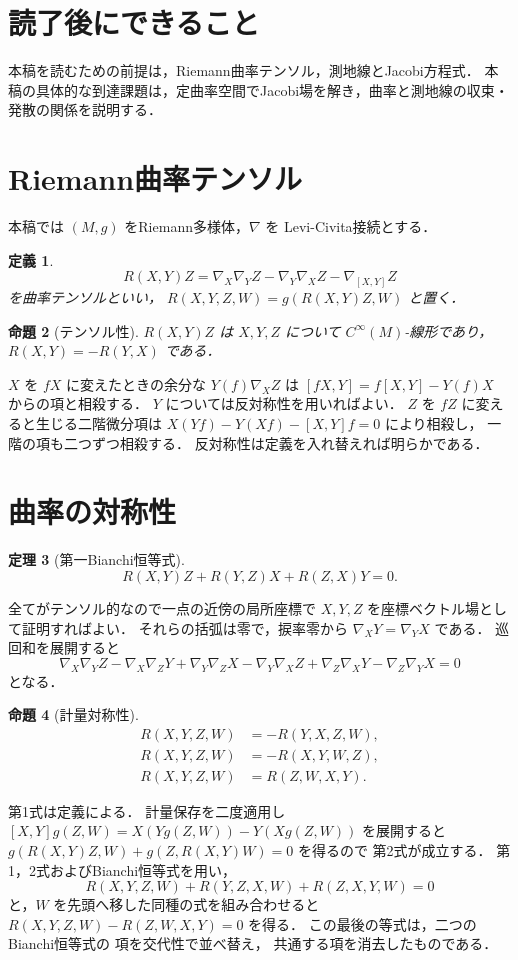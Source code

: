 \documentclass[a5paper,10pt,onecolumn]{jsarticle}
\makeatletter
\theoremstyle{mathnotetheorem}
\newtheorem{theorem}{定理}[section]
\newtheorem{definition}[theorem]{定義}
\newtheorem{proposition}[theorem]{命題}
\renewcommand{\proofname}{証明}
\renewenvironment{proof}[1][\proofname]{%
  \par\pushQED{\qed}\normalfont\topsep4\p@\@plus2\p@\relax
  \trivlist\item[\hskip\labelsep\bfseries #1]\ignorespaces
}{\popQED\endtrivlist\@endpefalse}
\makeatother
\begin{document}
\section*{読了後にできること}
本稿を読むための前提は，Riemann曲率テンソル，測地線とJacobi方程式．
本稿の具体的な到達課題は，定曲率空間でJacobi場を解き，曲率と測地線の収束・発散の関係を説明する．


\section{Riemann曲率テンソル}
本稿では $(M,g)$ をRiemann多様体，$\nabla$ を
Levi-Civita接続とする．
\begin{definition}
\[
 R(X,Y)Z=\nabla_X\nabla_YZ-\nabla_Y\nabla_XZ
 -\nabla_{[X,Y]}Z
\]
を曲率テンソルといい，
$R(X,Y,Z,W)=g(R(X,Y)Z,W)$ と置く．
\end{definition}
\begin{proposition}[テンソル性]
$R(X,Y)Z$ は $X,Y,Z$ について $C^\infty(M)$-線形であり，
$R(X,Y)=-R(Y,X)$ である．
\end{proposition}
\begin{proof}
$X$ を $fX$ に変えたときの余分な $Y(f)\nabla_XZ$ は
$[fX,Y]=f[X,Y]-Y(f)X$ からの項と相殺する．
$Y$ については反対称性を用いればよい．
$Z$ を $fZ$ に変えると生じる二階微分項は
$X(Yf)-Y(Xf)-[X,Y]f=0$ により相殺し，
一階の項も二つずつ相殺する．
反対称性は定義を入れ替えれば明らかである．
\end{proof}
\section{曲率の対称性}
\begin{theorem}[第一Bianchi恒等式]\label{thm:bianchi}
\[
 R(X,Y)Z+R(Y,Z)X+R(Z,X)Y=0.
\]
\end{theorem}
\begin{proof}
全てがテンソル的なので一点の近傍の局所座標で
$X,Y,Z$ を座標ベクトル場として証明すればよい．
それらの括弧は零で，捩率零から
$\nabla_XY=\nabla_YX$ である．
巡回和を展開すると
\[
 \nabla_X\nabla_YZ-\nabla_X\nabla_ZY
 +\nabla_Y\nabla_ZX-\nabla_Y\nabla_XZ
 +\nabla_Z\nabla_XY-\nabla_Z\nabla_YX=0
\]
となる．
\end{proof}
\begin{proposition}[計量対称性]\label{prop:curvsym}
\[
 \begin{aligned}
 R(X,Y,Z,W)&=-R(Y,X,Z,W),\\
 R(X,Y,Z,W)&=-R(X,Y,W,Z),\\
 R(X,Y,Z,W)&=R(Z,W,X,Y).
 \end{aligned}
\]
\end{proposition}
\begin{proof}
第1式は定義による．
計量保存を二度適用し
$[X,Y]g(Z,W)=X(Yg(Z,W))-Y(Xg(Z,W))$
を展開すると
$g(R(X,Y)Z,W)+g(Z,R(X,Y)W)=0$ を得るので
第2式が成立する．
第1，2式およびBianchi恒等式を用い，
\[
 R(X,Y,Z,W)+R(Y,Z,X,W)+R(Z,X,Y,W)=0
\]
と，$W$ を先頭へ移した同種の式を組み合わせると
$R(X,Y,Z,W)-R(Z,W,X,Y)=0$ を得る．
この最後の等式は，二つのBianchi恒等式の
項を交代性で並べ替え，
共通する項を消去したものである．
\end{proof}
\end{document}
